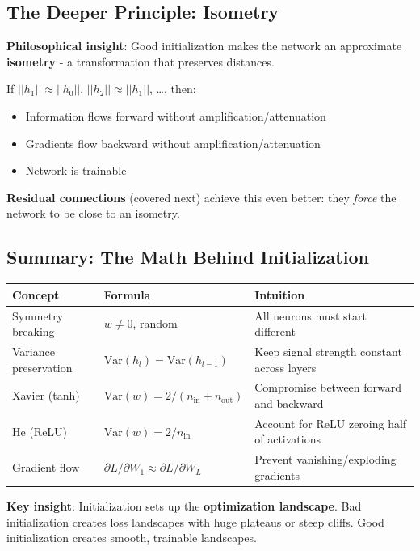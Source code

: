 \subsection{The Deeper Principle: Isometry}

\textbf{Philosophical insight}: Good initialization makes the network an approximate \textbf{isometry} - a transformation that preserves distances.

If $||h_1|| \approx ||h_0||$, $||h_2|| \approx ||h_1||$, \ldots, then:
\begin{itemize}
\item Information flows forward without amplification/attenuation
\item Gradients flow backward without amplification/attenuation
\item Network is trainable
\end{itemize}

\textbf{Residual connections} (covered next) achieve this even better: they \textit{force} the network to be close to an isometry.

\subsection{Summary: The Math Behind Initialization}

\begin{table}[h]
\centering
\begin{tabular}{lll}
\toprule
\textbf{Concept} & \textbf{Formula} & \textbf{Intuition} \\
\midrule
Symmetry breaking & $w \neq 0$, random & All neurons must start different \\
Variance preservation & $\text{Var}(h_l) = \text{Var}(h_{l-1})$ & Keep signal strength constant across layers \\
Xavier (tanh) & $\text{Var}(w) = 2/(n_{\text{in}} + n_{\text{out}})$ & Compromise between forward and backward \\
He (ReLU) & $\text{Var}(w) = 2/n_{\text{in}}$ & Account for ReLU zeroing half of activations \\
Gradient flow & $\partial L/\partial W_1 \approx \partial L/\partial W_L$ & Prevent vanishing/exploding gradients \\
\bottomrule
\end{tabular}
\end{table}

\textbf{Key insight}: Initialization sets up the \textbf{optimization landscape}. Bad initialization creates loss landscapes with huge plateaus or steep cliffs. Good initialization creates smooth, trainable landscapes.

